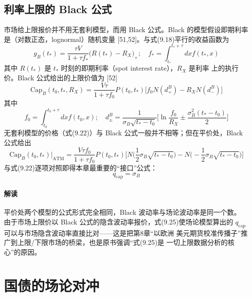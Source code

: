\subsection{利率上限的 Black 公式}

市场给上限报价并不用无套利模型，而用 Black 公式。Black 的模型假设即期利率
是（对数正态，lognormal）随机变量 [51,52]。与式(9.18)平行的收益函数为
\begin{equation*}
g_{B}(t_*)=\frac{\tau V}{1+\tau f_{*}}\bigl(R(t_*)-R_{X}\bigr)_{+};\quad
f_{*}=\int_{t_*}^{t_*+\tau}dxf(t_*,x)\tag{9.23}
\end{equation*}
其中 $R(t_*)$ 是 $t_*$ 时刻的即期利率（spot interest rate），$R_X$ 是利率
上的执行价。Black 公式给出的上限价值为 [52]
\begin{equation*}
\mathrm{Cap}_{B}(t_0,t_*,R_{X})=\frac{V\tau}{1+\tau f_0}
P(t_0,t_*)\bigl[f_0N(d^{B}_{+})-R_{X}N(d^{B}_{-})\bigr]\tag{9.24}
\end{equation*}
其中
\begin{equation*}
f_0=\int_{t_0}^{t_0+\tau}dxf(t_0,x);\quad
d^{B}_{\pm}=\frac{1}{\sigma_{B}\sqrt{t_*-t_0}}
\biggl[\ln\frac{f_0}{R_{X}}\pm\frac{\sigma^{2}_{B}(t_*-t_0)}{2}\biggr]
\end{equation*}
无套利模型的价格（式(9.22)）与 Black 公式一般并不相等；但在平价处，Black
公式给出
\begin{equation*}
\mathrm{Cap}_{B}(t_0,t_*)\big|_{\mathrm{ATM}}
=\frac{V\tau f_0}{1+\tau f_0}P(t_0,t_*)\biggl[
N\biggl(\frac{1}{2}\sigma_{B}\sqrt{t_*-t_0}\biggr)
-N\biggl(-\frac{1}{2}\sigma_{B}\sqrt{t_*-t_0}\biggr)\biggr]
\end{equation*}
与式(9.22)逐项对照即得本章最重要的“接口”公式：
\begin{equation*}
q_{\mathrm{cap}}=\sigma_{B}\tag{9.25}
\end{equation*}
\paragraph{解读}
平价处两个模型的公式形式完全相同，Black 波动率与场论波动率是同一个数。
由于市场上限价以 Black 公式的隐含波动率报价，式(9.25)使场论模型算出的
$q_{\mathrm{cap}}$ 可以与市场隐含波动率直接比对——这是把第8章“以欧洲
美元期货校准传播子”推广到上限/下限市场的桥梁，也是原书强调“式(9.25)是
一切上限数据分析的核心”的原因。

\section{国债的场论对冲}

